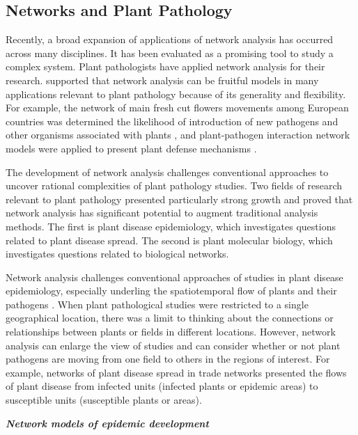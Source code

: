 \subsection*{Networks and Plant Pathology}

Recently, a broad expansion of applications of network analysis has occurred across many disciplines. It has been evaluated as a promising tool to study a complex system. Plant pathologists have applied network analysis for their research. \citet{Lefebvre:2011fo,Jeger:2007tn,windram2014network} supported that network analysis can be fruitful models in many applications relevant to plant pathology because of its generality and flexibility. For example, the network of main fresh cut flowers movements among European countries was determined the likelihood of introduction of new pathogens and other organisms associated with plants \citep{eagling2007australian}, and plant-pathogen interaction network models were applied to present plant defense mechanisms \citep{dietz2010hubs}. 

The development of network analysis challenges conventional approaches to uncover rational complexities of plant pathology studies. Two fields of research relevant to plant pathology presented particularly strong growth and proved that network analysis has significant potential to augment traditional analysis methods. The first is plant disease epidemiology, which investigates questions related to plant disease spread. The second is plant molecular biology, which investigates questions related to biological networks.


Network analysis challenges conventional approaches of studies in plant disease epidemiology, especially underling the spatiotemporal flow of plants and their pathogens \citep{Moslonka2010}. When plant pathological studies were restricted to a single geographical location, there was a limit to thinking about the connections or relationships between plants or fields in different locations. However, network analysis can enlarge the view of studies and can consider whether or not plant pathogens are moving from one field to others in the regions of interest. For example, networks of plant disease spread in trade networks presented the flows of plant disease from infected units (infected plants or epidemic areas) to susceptible units (susceptible plants or areas).

\textit{\textbf{Network models of epidemic development}}
 
